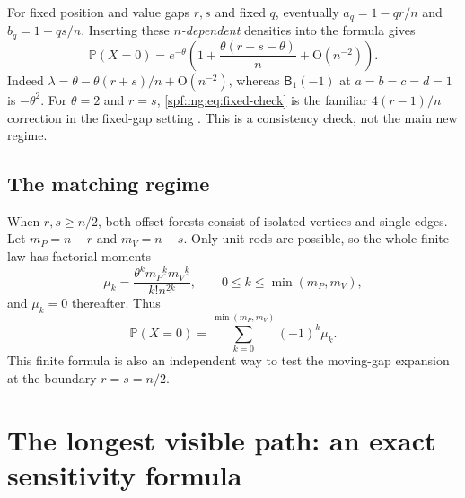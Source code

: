 \documentclass[11pt]{article}
\numberwithin{equation}{section}
\theoremstyle{definition}
\theoremstyle{remark}
\theoremstyle{definition}
\newcommand{\Pp}{\mathbb P}
\newcommand{\fall}[2]{{#1}^{\underline{#2}}}
\newcommand{\bigO}{\mathrm O}
\begin{document}
For fixed position and value gaps $r,s$ and fixed $q$, eventually
$a_q=1-qr/n$ and $b_q=1-qs/n$. Inserting these \emph{$n$-dependent}
densities into the formula gives
\begin{equation}
 \Pp(X=0)=e^{-\theta}
 \left(1+\frac{\theta(r+s-\theta)}n+\bigO(n^{-2})\right).
 \label{spf:mg:eq:fixed-check}
\end{equation}
Indeed $\lambda=\theta-\theta(r+s)/n+\bigO(n^{-2})$, whereas
$\mathsf B_1(-1)$ at $a=b=c=d=1$ is $-\theta^2$.
For $\theta=2$ and $r=s$, \eqref{spf:mg:eq:fixed-check} is the familiar
$4(r-1)/n$ correction in the fixed-gap setting \cite{tauraso,mgProveIt}.
This is a consistency check, not the main new regime.

\subsection{The matching regime}

When $r,s\ge n/2$, both offset forests consist of isolated vertices and
single edges. Let $m_P=n-r$ and $m_V=n-s$. Only unit rods are possible,
so the whole finite law has factorial moments
\begin{equation}
 \mu_k=\frac{\theta^k\fall{m_P}k\fall{m_V}k}
                 {k!\fall n{2k}},
 \qquad 0\le k\le\min(m_P,m_V),
 \label{spf:mg:eq:matching-moments}
\end{equation}
and $\mu_k=0$ thereafter. Thus
\begin{equation}
 \Pp(X=0)=\sum_{k=0}^{\min(m_P,m_V)}(-1)^k\mu_k.
 \label{spf:mg:eq:matching-avoid}
\end{equation}
This finite formula is also an independent way to test the moving-gap
expansion at the boundary $r=s=n/2$.

\section{The longest visible path: an exact sensitivity formula}
\label{spf:mg:sec:sensitivity}
\end{document}
